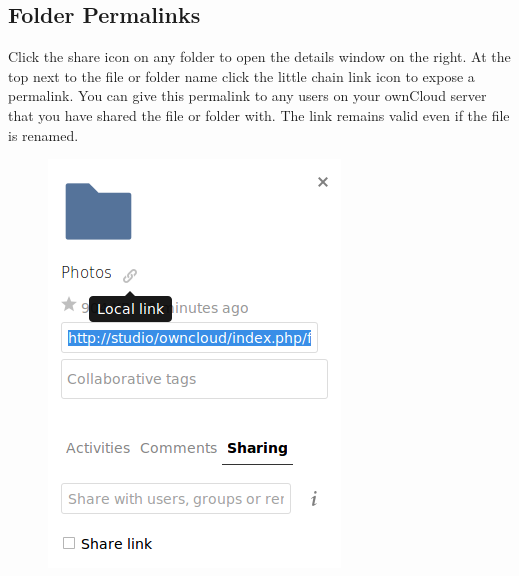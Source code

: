 \documentclass[letterpaper,10pt,english]{sphinxmanual}
\begin{document}
\subsection{Folder Permalinks}
\label{files/access_webgui:folder-permalinks}
Click the share icon on any folder to open the details window on the right. At the top next to the file or folder name click the little chain link icon to expose a permalink. You can give this permalink to any users on your ownCloud server that you have shared the file or folder with. The link remains valid even if the file is renamed.
\begin{figure}[htbp]
\centering

\includegraphics{permalink.png}
\end{figure}
\end{document}
